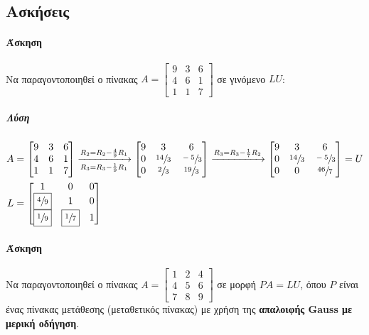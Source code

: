 \documentclass[11pt,a4paper,notitlepage,fleqn,final]{article}
\begin{document}
\subsection{Ασκήσεις}
\paragraph{Άσκηση}
Να παραγοντοποιηθεί ο πίνακας \( A=\left[\begin{matrix}
9&3&6\\4&6&1\\1&1&7
\end{matrix}\right] \) σε γινόμενο \( LU \):
\subparagraph{Λύση}
\begin{align*}
	A &= \left[\begin{matrix}
	9&3&6\\4&6&1\\1&1&7
	\end{matrix}\right]
	\xrightarrow[R_3=R_3-\frac{1}{9}R_1]{R_2=R_2-\frac{4}{9}R_1}
	\left[\begin{matrix}
	9&3&6\\0&\sfrac{14}{3}&\sfrac{-5}{3}\\
	0&\sfrac{2}{3} &\sfrac{19}{3}
	\end{matrix}\right]
	\xrightarrow{R_3=R_3-\frac{1}{7}R_2}\left[\begin{matrix}
	9&3&6\\0&\sfrac{14}{3} &\sfrac{-5}{3} \\
	0&0&\sfrac{46}{7}
	\end{matrix}\right] = U \\
	L &= \left[\begin{matrix}
	1&0&0\\ \boxed{\sfrac{4}{9} } & 1 & 0 \\
	\boxed{\sfrac{1}{9} } & \boxed{\sfrac{1}{7} } & 1
	\end{matrix}\right]
\end{align*}

\paragraph{Άσκηση}
Να παραγοντοποιηθεί ο πίνακας
\(
A=\left[\begin{matrix}
1&2&4\\4&5&6\\7&8&9
\end{matrix}\right]
\) σε μορφή \( PA=LU \), όπου \( P \) είναι ένας πίνακας μετάθεσης
(μεταθετικός πίνακας) με χρήση της
\textbf{απαλοιφής Gauss με μερική οδήγηση}.
\end{document}
